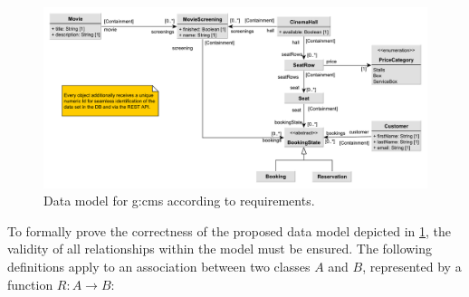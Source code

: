 \begin{figure}[H]
    \centering
    \includegraphics[width=\textwidth]{images/data-model-final-enum}
    \caption{Data model for \gls{g:cms} according to requirements.}
    \label{fig:data-model}
\end{figure}

To formally prove the correctness of the proposed data model depicted in \cref{fig:data-model}, the validity of all relationships within the model must be ensured. The following definitions apply to an association between two classes $A$ and $B$, represented by a function $R : A \to B$:

